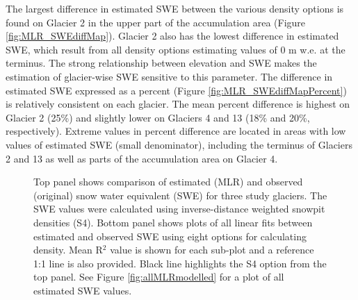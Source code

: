 \documentclass{sfuthesis}
\begin{document}
The largest difference in estimated SWE between the various density options is found on Glacier 2 in the upper part of the accumulation area (Figure \ref{fig:MLR_SWEdiffMap}). Glacier 2 also has the lowest difference in estimated SWE, which result from all density options estimating values of 0 m w.e. at the terminus. The strong relationship between elevation and SWE makes the estimation of glacier-wise SWE sensitive to this parameter. The difference in estimated SWE expressed as a percent (Figure \ref{fig:MLR_SWEdiffMapPercent}) is relatively consistent on each glacier. The mean percent difference is highest on Glacier 2 (25\%) and slightly lower on Glaciers 4 and 13 (18\% and 20\%, respectively). Extreme values in percent difference are located in areas with low values of estimated SWE (small denominator), including the terminus of Glaciers 2 and 13 as well as parts of the accumulation area on Glacier 4.  



\begin{figure}[H]
    \centering
    \begin{subfigure}[b]{\textwidth}
    \end{subfigure}
    
    \begin{subfigure}[b]{\textwidth}
    \end{subfigure}

    \caption{Top panel shows comparison of estimated (MLR) and observed (original) snow water equivalent (SWE) for three study glaciers. The SWE values were calculated using inverse-distance weighted snowpit densities (S4). Bottom panel shows plots of all linear fits between estimated and observed SWE using eight options for calculating density. Mean R$^2$ value is shown for each sub-plot and a reference 1:1 line is also provided. Black line highlights the S4 option from the top panel. See Figure \ref{fig:allMLRmodelled} for a plot of all estimated SWE values.}
    \label{fig:MLRfit}
\end{figure}
\end{document}
